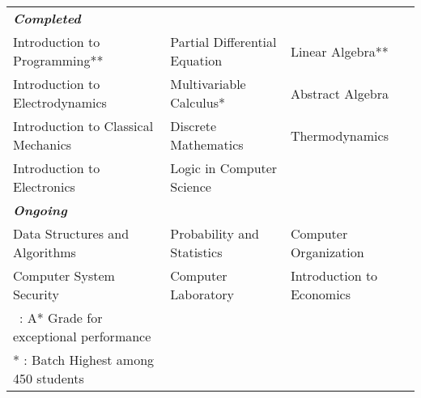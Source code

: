\documentclass[12pt, a4paper]{awesome-cv}
\begin{document}
{%
{\fontsize{11pt}{1em}\bodyfontlight\upshape\color{text}
\begin{tabular}{l l l}
\textbf{\textit{Completed}}\\
 Introduction to Programming** & Partial Differential Equation & Linear Algebra**\\ 
 Introduction to Electrodynamics & Multivariable Calculus* & Abstract Algebra\\
 Introduction to Classical Mechanics & Discrete Mathematics & Thermodynamics\\
 Introduction to Electronics & Logic in Computer Science\\
\textbf{\textit{Ongoing}}\\
 Data Structures and Algorithms & Probability and Statistics & Computer Organization\\
 Computer System Security & Computer Laboratory & Introduction to Economics\\

 {\footnotesize *\ : A* Grade for exceptional performance}\\
 {\footnotesize ** : Batch Highest among 450 students}
 \end{tabular}
\vspace{-0.5cm}
\\
\\
\\
{\fontsize{12pt}{1em}\bodyfontlight\upshape\color{text}
\begin{cvskills}


\end{cvskills}}}}
\end{document}
